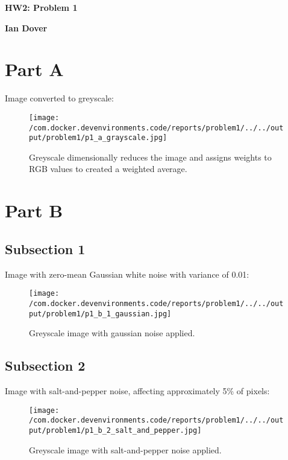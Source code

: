 \documentclass{article}%
\begin{document}
%
\normalsize%
\pagestyle{header}%
\begin{minipage}{\textwidth}%
\centering%
\begin{Large}%
\textbf{HW2: Problem 1}%
\end{Large}%
\linebreak%
\begin{large}%
\textbf{Ian Dover}%
\end{large}%
\end{minipage}%
\section{Part A}%
\label{sec:PartA}%
Image converted to greyscale:%


\begin{figure}[h!]%
\centering%
\texttt{[image: /com.docker.devenvironments.code/reports/problem1/../../output/problem1/p1\_a\_grayscale.jpg]}%
\caption{Greyscale dimensionally reduces the image and assigns weights to RGB values to created a weighted average.}%
\end{figure}

%
\section{Part B}%
\label{sec:PartB}%
\subsection{Subsection 1}%
\label{subsec:Subsection1}%
Image with zero{-}mean Gaussian white noise with variance of 0.01:%


\begin{figure}[h!]%
\centering%
\texttt{[image: /com.docker.devenvironments.code/reports/problem1/../../output/problem1/p1\_b\_1\_gaussian.jpg]}%
\caption{Greyscale image with gaussian noise applied.}%
\end{figure}

%
\subsection{Subsection 2}%
\label{subsec:Subsection2}%
Image with salt{-}and{-}pepper noise, affecting approximately 5\% of pixels:%


\begin{figure}[h!]%
\centering%
\texttt{[image: /com.docker.devenvironments.code/reports/problem1/../../output/problem1/p1\_b\_2\_salt\_and\_pepper.jpg]}%
\caption{Greyscale image with salt{-}and{-}pepper noise applied.}%
\end{figure}

%
\end{document}
